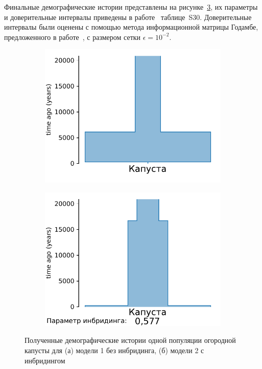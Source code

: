 Финальные демографические истории представлены на рисунке~\ref{fig:part2:experiments:cabbage:res}, их параметры и доверительные интервалы приведены в работе~\cite{noskova2023gadma2} таблице~S30.
Доверительные интервалы были оценены с помощью метода информационной матрицы Годамбе, предложенного в работе~\cite{coffman2016computationally}, с размером сетки $\epsilon=10^{-2}$.

\begin{figure}[ht]
    \centering
    \begin{subfigure}[b]{.49\textwidth}
    \includegraphics[width=\textwidth]{images_experiments/cabbage/cabbage_model1.pdf}
    \caption{}
    \label{fig:part2:experiments:cabbage:res_1}
    \end{subfigure}%
    \begin{subfigure}[b]{.49\textwidth}
    \includegraphics[width=\textwidth]{images_experiments/cabbage/cabbage_model2.pdf}
    \caption{}
    \label{fig:part2:experiments:cabbage:res_2}
    \end{subfigure}
    \caption{Полученные демографические истории одной популяции огородной капусты для (а) модели 1 без инбридинга, (б) модели 2 с инбридингом}
    \label{fig:part2:experiments:cabbage:res}
\end{figure}

